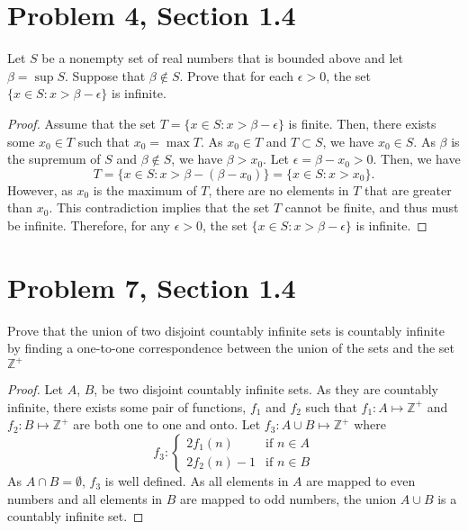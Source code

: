 \documentclass[12pt]{article}
\begin{document}
  \section*{Problem 4, Section 1.4}
  Let $S$ be a nonempty set of real numbers that is bounded above and let $\beta = \sup S$. Suppose that $\beta \notin S$. Prove that for each $\epsilon > 0$, the set $\{x \in S : x > \beta - \epsilon\}$ is infinite.
  \begin{proof}
    Assume that the set $T = {}\{x \in S : x > \beta - \epsilon\}$ is finite. Then, there exists some $x_0 \in T$ such that $x_0 = \max T$. As $x_0 \in T$ and $T \subset S$, we have $x_0 \in S$. As $\beta$ is the supremum of $S$ and $\beta \notin S$, we have $\beta > x_0$. Let $\epsilon = {\beta - x_0} > 0$. Then, we have 
    \[
      T = \{x \in S : x > \beta - (\beta - x_0)\} = \{x \in S : x > x_0\}.
    \]
    However, as $x_0$ is the maximum of $T$, there are no elements in $T$ that are greater than $x_0$. This contradiction implies that the set $T$ cannot be finite, and thus must be infinite. Therefore, for any $\epsilon > 0$, the set $\{x \in S : x > \beta - \epsilon\}$ is infinite.
  \end{proof}

  \newpage



  \section*{Problem 7, Section 1.4}
  Prove that the union of two disjoint countably infinite sets is countably infinite by finding a one-to-one correspondence between the union of the sets and the set $\mathbb{Z}^+$
  \begin{proof}
    Let $A$, $B$, be two disjoint countably infinite sets. As they are countably infinite, there exists some pair of functions, $f_1$ and $f_2$ such that $f_1: A \mapsto \mathbb{Z}^+$ and $f_2: B \mapsto \mathbb{Z}^+$ are both one to one and onto. Let $f_3: A \cup B \mapsto \mathbb{Z}^+$ where 
    \[
      f_3: \begin{cases} 
        2f_1(n) & \text{if } n \in A \\
        2f_2(n)-1 & \text{if } n \in B 
      \end{cases}
    \]
    As $A \cap B = \emptyset$, $f_3$ is well defined. As all elements in $A$ are mapped to even numbers and all elements in $B$ are mapped to odd numbers, the union $A \cup B$ is a countably infinite set.
  
  \end{proof}
\end{document}
